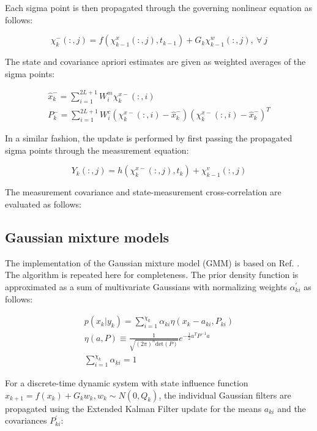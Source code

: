 \documentclass[]{article}
\begin{document}
Each sigma point is then propagated through the governing nonlinear equation as follows:

\begin{equation}
\chi^-_{k}(:,j) = f(\chi^x_{k-1}(:,j),t_{k-1}) + G_k \chi^w_{k-1}(:,j), \ \forall \ j
\end{equation}

The state and covariance apriori estimates are given as weighted averages of the sigma points:

\begin{align}
\hat{x}_k^- = \sum_{i=1}^{2L+1} W_i^m \chi^{x-}_k(:,i) \\
P_k^- = \sum_{i=1}^{2L+1} W_i^c (\chi^{x-}_k(:,i)-\hat{x}_k^-)(\chi^{x-}_k(:,i)-\hat{x}_k^-)^T
\end{align}

In a similar fashion, the update is performed by first passing the propagated sigma points through the measurement equation:

\begin{equation}
Y_k(:,j) = h(\chi^{x-}_k(:,j),t_k) + \chi^v_{k-1}(:,j)
\end{equation}

The measurement covariance and state-measurement cross-correlation are evaluated as follows:


\subsection{Gaussian mixture models}

The implementation of the Gaussian mixture model (GMM) is based on Ref. \cite{alspach}. The algorithm is repeated here for completeness. The prior density function is approximated as a sum of multivariate Gaussians with normalizing weights $\alpha_{ki}^{'}$ as follows:

\begin{align}
	p(x_k | y_k) = \sum_{i=1}^{\chi_k} \alpha_{ki} \eta(x_k-a_{ki},P_{ki}) \\
	\eta(a,P) \equiv \frac{1}{\sqrt{(2\pi)^n \mathrm{det}(P)}} e^{-\frac{1}{2} a^T P^{-1} a} \\
	\sum_{i=1}^{\chi_k} \alpha_{ki} = 1
\end{align}

For a discrete-time dynamic system with state influence function $x_{k+1} = f(x_k) + G_k w_k,w_k \sim N(0,Q_k)$, the individual Gaussian filters are propagated using the Extended Kalman Filter update for the means $a_{ki}$ and the covariances $P_{ki}^{'}$:
\end{document}
